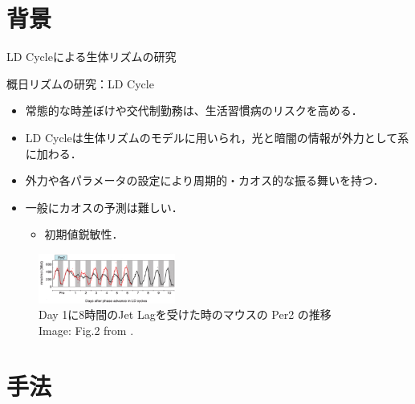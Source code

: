 \section{背景}
\begin{frame}{LD Cycleによる生体リズムの研究}
        \begin{block}{概日リズムの研究：LD Cycle}
          \begin{itemize}
            \item 常態的な時差ぼけや交代制勤務は、生活習慣病のリスクを高める．
            \item LD Cycleは生体リズムのモデルに用いられ，光と暗闇の情報が外力として系に加わる．
            \item 外力や各パラメータの設定により周期的・カオス的な振る舞いを持つ．
            \item 一般にカオスの予測は難しい．\begin{itemize}
              \item 初期値鋭敏性．
            \end{itemize}
          \end{itemize}
        \end{block}
      

      
        \begin{figure}
          \includegraphics[width=0.4\textwidth]{Fig/Jetlag.png}
          \caption{\scriptsize{Day 1に8時間のJet Lagを受けた時のマウスの Per2 の推移}\\\tiny{Image: Fig.2 from \cite{Yamaguchi et al.}.}}
      \end{figure}    
      
  \end{frame}

  \section{手法}

